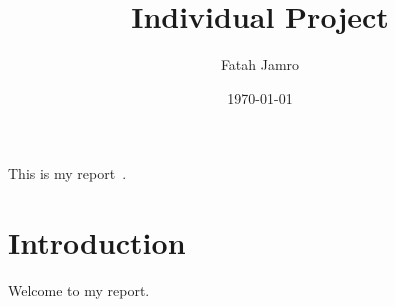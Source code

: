 \documentclass[a4paper, 12pt]{scrartcl}
\title{Individual Project}
\author{Fatah Jamro}
\date{\today}
\begin{document}
  
  \maketitle
  
  \noindent This is my report~\cite{md5}.



  \section{Introduction}

  Welcome to my report.

  
  
  
\end{document}
